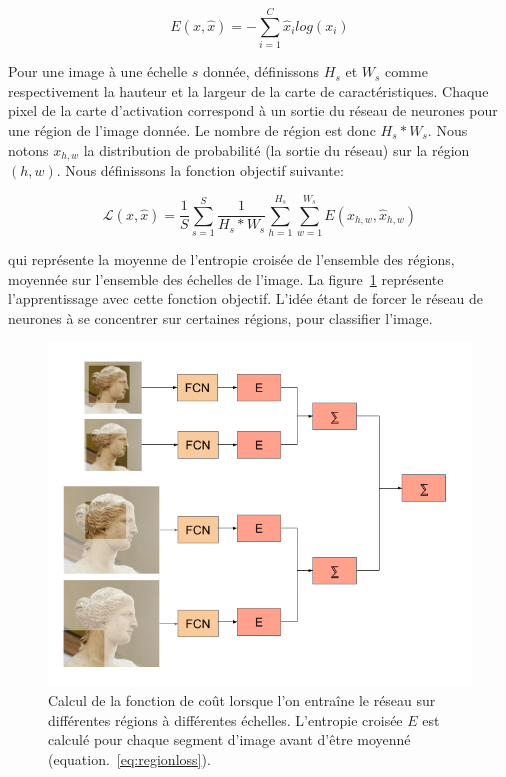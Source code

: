 \begin{equation}
  E(x,\hat{x}) = -\sum_{i=1}^C \hat{x}_i log(x_i)
	\label{eq:entropie2}
\end{equation}

Pour une image à une échelle $s$ donnée, définissons $H_s$ et $W_s$ comme respectivement la hauteur et la largeur de la carte de caractéristiques.
Chaque pixel de la carte d'activation correspond à un sortie du réseau de neurones pour une région de l'image donnée.
Le nombre de région est donc $H_s*W_s$. 
Nous notons $x_{h,w}$ la distribution de probabilité (la sortie du réseau) sur la région $(h,w)$.
Nous définissons la fonction objectif suivante:

\begin{equation}
 \mathcal{L}(x,\hat{x}) = \frac{1}{S} \sum_{s=1}^S \frac{1}{H_s*W_s} \sum_{h=1}^{H_s} \sum_{w=1}^{W_s} E(x_{h,w}, \hat{x}_{h,w})
\label{eq:regionloss}
\end{equation}

qui représente la moyenne de l'entropie croisée de l'ensemble des régions, moyennée sur l'ensemble des échelles de l'image.
La figure~\ref{fig:regionfinetuning} représente l'apprentissage avec cette fonction objectif. 
L'idée étant de forcer le réseau de neurones à se concentrer sur certaines régions, pour classifier l'image.


\begin{figure}[!htb]
\centering
    \includegraphics[width=\linewidth]{figures/Average_Loss.png}
    \caption{Calcul de la fonction de coût lorsque l'on entraîne le réseau sur différentes régions à différentes échelles. L'entropie croisée $E$ est calculé pour chaque segment d'image avant d'être moyenné (equation.~\ref{eq:regionloss}).
    \label{fig:regionfinetuning}}
\end{figure}


